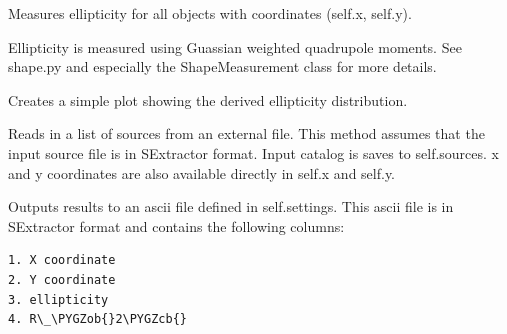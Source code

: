 \documentclass[a4paper,12pt,english]{sphinxmanual}
\def\PYGZob{\char`\{}
\def\PYGZcb{\char`\}}
\begin{document}
\begin{fulllineitems}
\begin{fulllineitems}
\end{fulllineitems}


\begin{fulllineitems}
\label{analysis:analysis.analyse.analyseVISdata.measureEllipticity}
Measures ellipticity for all objects with coordinates (self.x, self.y).

Ellipticity is measured using Guassian weighted quadrupole moments.
See shape.py and especially the ShapeMeasurement class for more details.

\end{fulllineitems}


\begin{fulllineitems}
\label{analysis:analysis.analyse.analyseVISdata.plotEllipticityDistribution}
Creates a simple plot showing the derived ellipticity distribution.

\end{fulllineitems}


\begin{fulllineitems}
\label{analysis:analysis.analyse.analyseVISdata.readSources}
Reads in a list of sources from an external file. This method assumes
that the input source file is in SExtractor format. Input catalog is
saves to self.sources. x and y coordinates are also available directly in self.x and self.y.

\end{fulllineitems}


\begin{fulllineitems}
\label{analysis:analysis.analyse.analyseVISdata.writeResults}
Outputs results to an ascii file defined in self.settings. This ascii file
is in SExtractor format and contains the following columns:

\begin{Verbatim}[commandchars=\\\{\}]
1. X coordinate
2. Y coordinate
3. ellipticity
4. R\_\PYGZob{}2\PYGZcb{}
\end{Verbatim}

\end{fulllineitems}


\end{fulllineitems}
\end{document}

